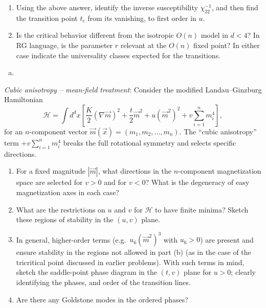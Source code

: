 \begin{problem}
\begin{enumerate}
        \item[(i)] Using the above answer, identify the inverse susceptibility $\chi_{22}^{-1}$, and then find the transition point $t_c$ from its vanishing, to first order in $u$.

        \item[(j)] Is the critical behavior different from the isotropic $O(n)$ model in $d < 4$? In RG language, is the parameter $r$ relevant at the $O(n)$ fixed point? In either case indicate the universality classes expected for the transitions.
    \end{enumerate}
\end{problem}

\begin{solution}
    \begin{enumerate}[(a)]
        \item
    \end{enumerate}
\end{solution}

\begin{problem}
    \textit{Cubic anisotropy -- mean-field treatment}: Consider the modified Landau--Ginzburg Hamiltonian
    \[
        \mathcal{H} = \int d^dx\left[\frac{K}{2}(\nabla\vec{m})^2 + \frac{t}{2}\vec{m}^2 + u(\vec{m}^2)^2 + v\sum_{i=1}^n m_i^4\right],
    \]
    for an $n$-component vector $\vec{m}(\vec{x}) = (m_1, m_2, \ldots, m_n)$. The ``cubic anisotropy'' term $+v\sum_{i=1}^n m_i^4$ breaks the full rotational symmetry and selects specific directions.

    \begin{enumerate}
        \item[(a)] For a fixed magnitude $|\vec{m}|$, what directions in the $n$-component magnetization space are selected for $v > 0$ and for $v < 0$? What is the degeneracy of easy magnetization axes in each case?

        \item[(b)] What are the restrictions on $u$ and $v$ for $\mathcal{H}$ to have finite minima? Sketch these regions of stability in the $(u,v)$ plane.

        \item[(c)] In general, higher-order terms (e.g.\ $u_6(\vec{m}^2)^3$ with $u_6 > 0$) are present and ensure stability in the regions not allowed in part (b) (as in the case of the tricritical point discussed in earlier problems). With such terms in mind, sketch the saddle-point phase diagram in the $(t,v)$ plane for $u > 0$; clearly identifying the phases, and order of the transition lines.

        \item[(d)] Are there any Goldstone modes in the ordered phases?
    \end{enumerate}
\end{problem}

